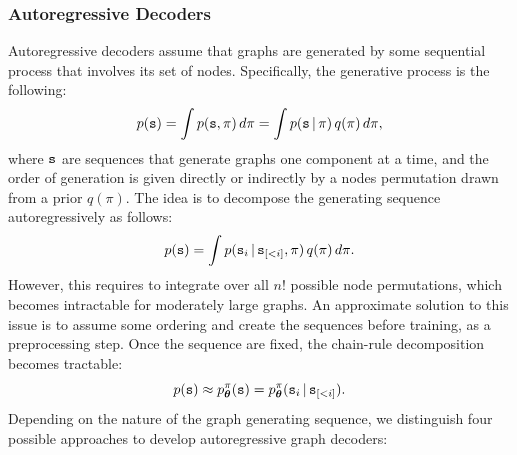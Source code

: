 \subsubsection*{Autoregressive Decoders}
Autoregressive decoders assume that graphs are generated by some sequential process that involves its set of nodes. Specifically, the generative process is the following:
$$p(\mathtt{s}) = \int p(\mathtt{s}, \pi)\, d\pi = \int p(\mathtt{s} \,|\, \pi)\, q(\pi)\, d\pi,$$
where $\mathtt{s}$ are sequences that generate graphs one component at a time, and the order of generation is given directly or indirectly by a nodes permutation drawn from a prior $q(\pi)$. The idea is to decompose the generating sequence autoregressively as follows:
$$p(\mathtt{s}) = \int p(\mathtt{s}_i \,|\, \mathtt{s}_{[<i]}, \pi)\, q(\pi)\, d\pi.$$
However, this requires to integrate over all $n!$ possible node permutations, which becomes intractable for moderately large graphs. An approximate solution to this issue is to assume some ordering and create the sequences before training, as a preprocessing step. Once the sequence are fixed, the chain-rule decomposition becomes tractable:
$$p(\mathtt{s}) \approx p_{\boldsymbol{\theta}}^{\pi}(\mathtt{s}) = p_{\boldsymbol{\theta}}^{\pi}(\mathtt{s}_i \,|\, \mathtt{s}_{[<i]}).$$
Depending on the nature of the graph generating sequence, we distinguish four possible approaches to develop autoregressive graph decoders:
